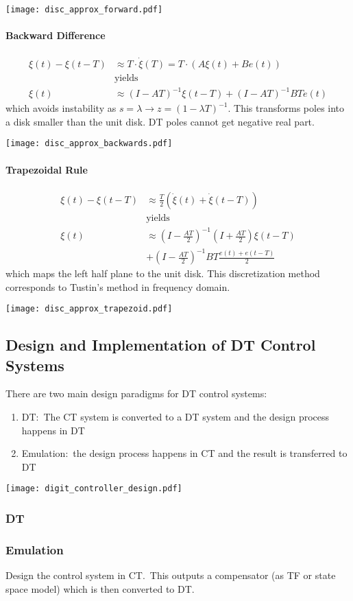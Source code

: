 \texttt{[image: disc\_approx\_forward.pdf]}

\paragraph{Backward Difference}
\begin{align*}
    \xi(t)-\xi(t-T) & \approx T\cdot\dot{\xi}(T) =T\cdot(A\xi(t)+Be(t)) \\
                    & \text{yields}                                     \\
    \xi(t)          & \approx{(I-AT)}^{-1}\xi(t-T)+{(I-AT)}^{-1}BTe(t)
\end{align*}
which avoids instability as $s=\lambda \rightarrow z={(1-\lambda T)}^{-1}$. This transforms poles into a disk smaller than the unit disk. DT poles cannot get negative real part.

\texttt{[image: disc\_approx\_backwards.pdf]}

\paragraph{Trapezoidal Rule}
\begin{align*}
    \xi(t)-\xi(t-T) & \approx \frac T2\left(\dot{\xi}(t)+\dot{\xi}(t-T)\right)                     \\
                    & \text{yields}                                                                \\
    \xi(t)          & \approx{\left(I-\frac{AT}{2}\right)}^{-1}\left(I+\frac{AT}{2}\right)\xi(t-T) \\
                    & +{\left(I-\frac{AT}{2}\right)}^{-1}BT\frac{e(t)+e(t-T)}2
\end{align*}
which maps the left half plane to the unit disk. This discretization method corresponds to Tustin's method in frequency domain.

\texttt{[image: disc\_approx\_trapezoid.pdf]}

\subsection{Design and Implementation of DT Control Systems}
There are two main design paradigms for DT control systems:
\begin{enumerate}
    \item DT:\ The CT system is converted to a DT system and the design process happens in DT
    \item Emulation:\ the design process happens in CT and the result is transferred to DT
\end{enumerate}

\begin{center}
    \texttt{[image: digit\_controller\_design.pdf]}
\end{center}

\subsubsection{DT}

\subsubsection{Emulation}
Design the control system in CT.\ This outputs a compensator (as TF or state space model) which is then converted to DT.

